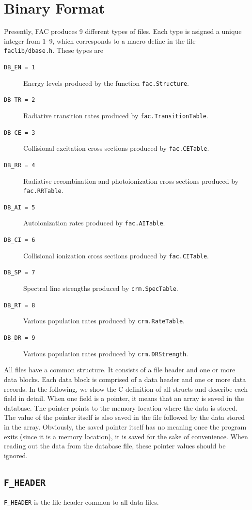 \documentclass[twoside,letterpaper]{refrep}
\begin{document}
\section{Binary Format}
\label{sec:binary}
Presently, FAC produces 9 different types of files. Each type is asigned
a unique integer from 1--9, which corresponds to a macro define in the file
\verb|faclib/dbase.h|. These types are
\begin{description}
\item[\texttt{DB\_EN = 1}] Energy levels produced by the function
\verb|fac.Structure|. 
\item[\texttt{DB\_TR = 2}] Radiative transition rates produced by
\verb|fac.TransitionTable|.
\item[\texttt{DB\_CE = 3}] Collisional excitation cross sections produced by
\verb|fac.CETable|. 
\item[\texttt{DB\_RR = 4}] Radiative recombination and photoionization cross
sections produced by \verb|fac.RRTable|.
\item[\texttt{DB\_AI = 5}] Autoionization rates produced by \verb|fac.AITable|.
\item[\texttt{DB\_CI = 6}] Collisional ionization cross sections produced by
\verb|fac.CITable|. 
\item[\texttt{DB\_SP = 7}] Spectral line strengths produced by
\verb|crm.SpecTable|. 
\item[\texttt{DB\_RT = 8}] Various population rates produced by
\verb|crm.RateTable|. 
\item[\texttt{DB\_DR = 9}] Various population rates produced by
\verb|crm.DRStrength|. 
\end{description}

All files have a common structure. It consists of a file header and one or
more data blocks. Each data block is comprised of a data header and one or
more data records. In the following, we show the C definition of all structs
and describe each field in detail. When one field is a pointer, it means that
an array is saved in the database. The pointer points to the memory location
where the data is stored. The value of the pointer itself is also
saved in the file followed by the data stored in the array. Obviously, the
saved pointer itself has no meaning once the program exits (since it is a
memory location), it is saved for the sake of convenience. When reading out
the data from the database file, these pointer values should be ignored.

\subsection{\texttt{F\_HEADER}}
\texttt{F\_HEADER} is the file header common to all data files. 
\end{document}
